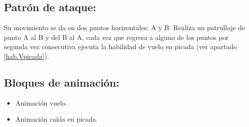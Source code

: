 \subsection{Patrón de ataque:}
Su movimiento se da en dos puntos horizontales: A y B. Realiza un patrullaje de punto A al B y del B al A, cada vez que regresa a alguno de los puntos por segunda vez consecutiva ejecuta la habilidad de vuelo en picada (ver apartado \ref{hab.Vpicada}).
\subsection{Bloques de animación:}
\begin{itemize}
		\item Animación vuelo.
		\item Animación caída en picada.
	\end{itemize}
